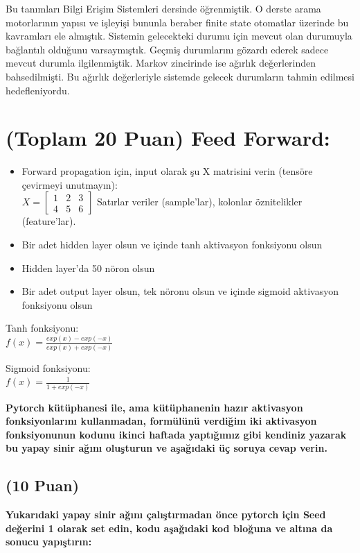 \documentclass[11pt]{article}
\begin{document}
Bu tanımları Bilgi Erişim Sistemleri dersinde öğrenmiştik. O derste arama motorlarının yapısı ve işleyişi bununla beraber finite state otomatlar üzerinde bu kavramları ele almıştık. Sistemin gelecekteki durumu için mevcut olan durumuyla bağlantılı olduğunu varsaymıştık. Geçmiş durumlarını gözardı ederek sadece mevcut durumla ilgilenmiştik. Markov zincirinde ise ağırlık değerlerinden bahsedilmişti. Bu ağırlık değerleriyle sistemde gelecek durumların tahmin edilmesi hedefleniyordu. 

\section{(Toplam 20 Puan) Feed Forward:}
 
\begin{itemize}
    \item Forward propagation için, input olarak şu X matrisini verin (tensöre çevirmeyi unutmayın):\\
    $X = \begin{bmatrix}
        1 & 2 & 3\\
        4 & 5 & 6
        \end{bmatrix}$
    Satırlar veriler (sample'lar), kolonlar öznitelikler (feature'lar).
    \item Bir adet hidden layer olsun ve içinde tanh aktivasyon fonksiyonu olsun
    \item Hidden layer'da 50 nöron olsun
    \item Bir adet output layer olsun, tek nöronu olsun ve içinde sigmoid aktivasyon fonksiyonu olsun
\end{itemize}

Tanh fonksiyonu:\\
$f(x) = \frac{exp(x) - exp(-x)}{exp(x) + exp(-x)}$
\vspace{.2in}

Sigmoid fonksiyonu:\\
$f(x) = \frac{1}{1 + exp(-x)}$

\vspace{.2in}
 \textbf{Pytorch kütüphanesi ile, ama kütüphanenin hazır aktivasyon fonksiyonlarını kullanmadan, formülünü verdiğim iki aktivasyon fonksiyonunun kodunu ikinci haftada yaptığımız gibi kendiniz yazarak bu yapay sinir ağını oluşturun ve aşağıdaki üç soruya cevap verin.}
 
\subsection{(10 Puan)} \textbf{Yukarıdaki yapay sinir ağını çalıştırmadan önce pytorch için Seed değerini 1 olarak set edin, kodu aşağıdaki kod bloğuna ve altına da sonucu yapıştırın:}
\end{document}

